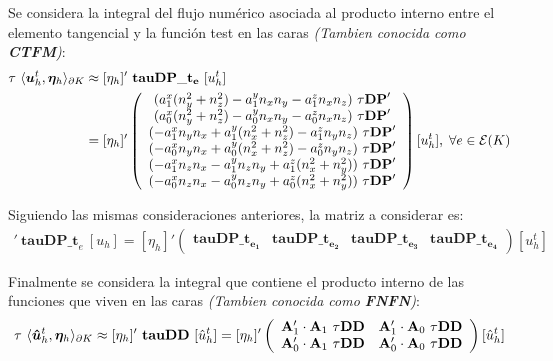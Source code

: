 \documentclass{article}
\begin{document}
\noindent Se considera la integral del flujo numérico asociada al producto interno entre el elemento tangencial y la función test en las caras \textit{(Tambien conocida como \textbf{CTFM})}:
\begin{align*}
    \tau~\langle \boldsymbol{u}_h^t, \boldsymbol{\eta}_h \rangle_{\partial K} &\approx
    [\eta_h]'~\mathbf{tauDP\_t_e}~[u_h^t] \\ &= 
    [\eta_h]'
    \left(
    \begin{array}{ccc}
     	( a_{1}^x (n_y^2 + n_z^2) -a_{1}^y n_x n_y - a_{1}^z n_x n_z )~\tau \mathbf{DP}' \\
	( a_{0}^x (n_y^2 + n_z^2) -a_{0}^y n_x n_y - a_{0}^z n_x n_z )~\tau \mathbf{DP}' \\
        ( -a_{1}^x n_y n_x  + a_{1}^y (n_x^2 + n_z^2) - a_{1}^z n_y n_z )~\tau \mathbf{DP}' \\
        ( -a_{0}^x n_y n_x  + a_{0}^y (n_x^2 + n_z^2) - a_{0}^z n_y n_z )~\tau \mathbf{DP}' \\
        ( -a_{1}^x n_z n_x  - a_{1}^y n_z n_y + a_{1}^z (n_x^2 + n_y^2) )~\tau \mathbf{DP}'  \\
        ( -a_{0}^x n_z n_x  - a_{0}^y n_z n_y + a_{0}^z (n_x^2 + n_y^2) )~\tau \mathbf{DP}' 
    \end{array}
    \right)
    [u_h^t], \hspace{1mm}
    \forall e \in \mathcal{E}(K)
\end{align*}

\noindent Siguiendo las mismas consideraciones anteriores, la matriz a considerar es:
\begin{align}
    [\eta_h]'~\mathbf{tauDP\_t}_e~[u_h]   = 
    [\eta_h]'
    \left(
    \begin{array}{cccc}
        \mathbf{tauDP\_t_{e_1}} & \mathbf{tauDP\_t_{e_2}} & \mathbf{tauDP\_t_{e_3}} & \mathbf{tauDP\_t_{e_4}}
    \end{array}
    \right)
    [u_h^t]
\end{align}

\noindent Finalmente se considera la integral que contiene el producto interno de las funciones que viven en las caras \textit{(Tambien conocida como \textbf{FNFN})}:
\begin{align}
    \tau~\langle \boldsymbol{\hat{u}}_h^t, \boldsymbol{\eta}_h \rangle_{\partial K} \approx
    [\eta_h]'~\mathbf{tauDD}~[\hat{u}^t_h]  = 
    [\eta_h]'
    \left(
    \begin{array}{cc}
        \mathbf{A}_1' \cdot \mathbf{A}_1~\mathbf{\tau DD} & \mathbf{A}_1' \cdot \mathbf{A}_0~\mathbf{\tau DD} \\
        \mathbf{A}_0' \cdot \mathbf{A}_1~\mathbf{\tau DD} & \mathbf{A}_0' \cdot \mathbf{A}_0~\mathbf{\tau DD} \\
    \end{array}
    \right)
    [\hat{u}^t_h]
\end{align}
\end{document}
